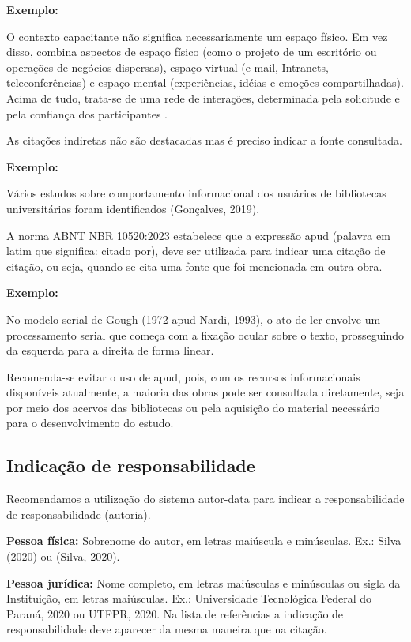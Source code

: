 \vspace{0.5cm}\noindent\textbf{Exemplo:}

O contexto capacitante não significa necessariamente um espaço físico. Em vez disso, combina aspectos de espaço físico (como o projeto de um escritório ou operações de negócios dispersas), espaço virtual (e-mail, Intranets, teleconferências) e espaço mental (experiências, idéias e emoções compartilhadas). Acima de tudo, trata-se de uma rede de interações, determinada pela solicitude e pela confiança dos participantes \cite[p. 66]{KROGH:2001}.

As citações indiretas não são destacadas mas é preciso indicar a fonte consultada. 

\vspace{0.5cm}\noindent\textbf{Exemplo:}

Vários estudos sobre comportamento informacional dos usuários de bibliotecas universitárias foram identificados (Gonçalves, 2019).

A norma ABNT NBR 10520:2023 estabelece que a expressão apud (palavra em latim que significa: citado por), deve ser utilizada para indicar uma citação de citação, ou seja, quando se cita uma fonte que foi mencionada em outra obra. 

\vspace{0.5cm}\noindent\textbf{Exemplo:}

No modelo serial de Gough (1972 apud Nardi, 1993), o ato de ler envolve um processamento serial que começa com a fixação ocular sobre o texto, prosseguindo da esquerda para a direita de forma linear.

Recomenda-se evitar o uso de apud, pois, com os recursos informacionais disponíveis atualmente, a maioria das obras pode ser consultada diretamente, seja por meio dos acervos das bibliotecas ou pela aquisição do material necessário para o desenvolvimento do estudo.

\newpage
\subsection{Indicação de responsabilidade}

Recomendamos a utilização do sistema autor-data para indicar a responsabilidade de responsabilidade (autoria).

\textbf{Pessoa física:} Sobrenome do autor, em letras maiúscula e minúsculas. Ex.: Silva (2020) ou (Silva, 2020).

\textbf{Pessoa jurídica:} Nome completo, em letras maiúsculas e minúsculas ou sigla da Instituição, em letras maiúsculas. Ex.: Universidade Tecnológica Federal do Paraná, 2020 ou UTFPR, 2020. Na lista de referências a indicação de responsabilidade deve aparecer da mesma maneira que na citação. 

